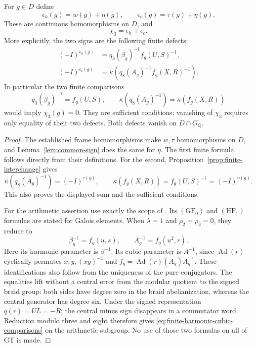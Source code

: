 \begin{proposition}
\label{prop:pair-of-gates}
For $g\in D$ define
\[
 \epsilon_h(g)=w(g)+\eta(g),\qquad
 \epsilon_c(g)=\tau(g)+\eta(g).
\]
These are continuous homomorphisms on $D$, and
\[
 \boxed{\quad \chi_3=\epsilon_h+\epsilon_c.\quad}
\]
More explicitly, the two signs are the following finite defects:
\[
 \begin{split}
 (-I)^{\epsilon_h(g)}
   &=q_3(\beta_g)^{-1}f_g(U,S)^{-1},\\
 (-I)^{\epsilon_c(g)}
   &=\kappa\!\left(q_8(A_g)^{-1}f_g(X,R)^{-1}\right).
 \end{split}
\]
In particular the two finite comparisons
\begin{equation}
 q_3(\beta_g)^{-1}=f_g(U,S),\qquad
 \kappa(q_8(A_g)^{-1})=\kappa(f_g(X,R))
 \label{eq:finite-harmonic-cubic-comparisons}
\end{equation}
would imply $\chi_3(g)=0$.  They are sufficient conditions;
vanishing of $\chi_3$ requires only equality of their two defects.
Both defects vanish on $D\cap G_{\mathbb Q}$.
\end{proposition}
\begin{proof}
The established frame homomorphisms make $w,\tau$ homomorphisms
on $D$, and Lemma~\ref{lem:common-sign} does the same for $\eta$.
The first finite formula follows directly from their definitions.
For the second, Proposition~\ref{prop:finite-interchange} gives
\[
 \kappa(q_8(A_g)^{-1})=(-I)^{\tau(g)},\qquad
 \kappa(f_g(X,R))=f_g(U,S)^{-1}=(-I)^{\eta(g)}.
\]
This also proves the displayed sum and the sufficient conditions.

For the arithmetic assertion use exactly the scope of
\cite[Theorem~2, pp.~199--200]{NT2002}.  Its $(\mathrm{GF}_0)$ and
$(\mathrm{HF}_1)$ formulas are stated for Galois elements.
When $\lambda=1$ and $\rho_2=\rho_3=0$, they reduce to
\[
 \beta_g^{-1}=f_g(u,s),\qquad A_g^{-1}=f_g(u^2,r).
\]
Here its harmonic parameter is $\beta^{-1}$.  Its cubic
parameter is $A^{-1}$, since $\operatorname{Ad}(r)$ cyclically
permutes $x,y,(xy)^{-1}$ and
$f_g=\operatorname{Ad}(r)(A_g)A_g^{-1}$.
These identifications also follow from the uniqueness of the
pure conjugators.  The equalities lift without a central error
from the modular quotient to the signed braid group: both
sides have degree zero in the braid abelianization, whereas
the central generator has degree six.
Under the signed representation $q(r)=UL=-R$; the central
minus sign disappears in a commutator word.
Reduction modulo three and eight therefore gives
\eqref{eq:finite-harmonic-cubic-comparisons} on the arithmetic
subgroup.  No use of those two formulas on all of GT is made.
\end{proof}

